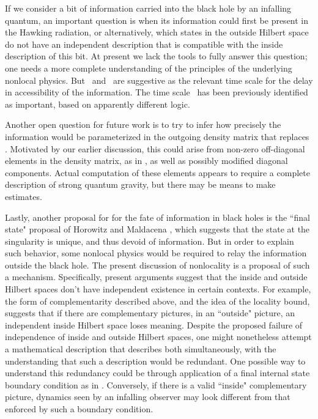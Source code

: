 If we consider a bit of information carried into the black hole by an infalling quantum, an important question is when its information could first be present in the Hawking radiation, or alternatively, which states in the outside Hilbert space do not have an independent description that is compatible with the inside description of this bit.  At present we lack the tools to fully answer this question; one needs a more complete understanding of the principles of the underlying nonlocal physics.  But \locbdt\ and \locbte\ are suggestive as the relevant time scale for the delay in accessibility of the information.   The time scale \locbte\ has been previously identified as important, based on apparently different logic.

Another open question for future work is to try to infer how precisely the information would be parameterized in the outgoing density matrix that replaces \densmat. Motivated by our earlier discussion, this could arise from non-zero off-diagonal elements in the density matrix, as in \extwo, as well as possibly modified diagonal components.  Actual computation of these elements appears to require a complete description of strong quantum gravity, but there may be means to make estimates.

Lastly, another proposal for for the fate of information in black holes is the ``final state" proposal of Horowitz and Maldacena , which suggests that the state at the singularity is unique, and thus devoid of information.  But in order to explain such behavior, some nonlocal physics would be required to relay the information outside the black hole.  The present discussion of nonlocality is a proposal of such a mechanism. Specifically, present arguments suggest that the inside and outside Hilbert spaces don't have independent existence in certain contexts.  For example, the  form of complementarity described above, and the idea of the locality bound, suggests that if there are complementary pictures, in an ``outside" picture, an independent inside Hilbert space loses meaning.  Despite the proposed failure of independence of inside and outside Hilbert spaces, one might nonetheless attempt a mathematical description that describes both simultaneously, with the understanding that such a description would be redundant.   One possible way to understand this redundancy could be through
application of a final internal state boundary condition as in \HoMa.
Conversely, if there is a valid ``inside" complementary picture, dynamics seen by an infalling observer may look different from that enforced by such a boundary condition.

